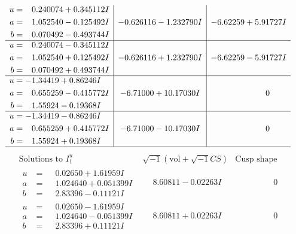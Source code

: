 \documentclass[1p]{elsarticle_modified}
\theoremstyle{definition}
\newcommand{\I}{\sqrt{-1}}
\begin{document}
$$\begin{array}{c|c|c}
\begin{aligned}
u &= \phantom{-}0.240074 + 0.345112 I \\
a &= \phantom{-}1.052540 - 0.125492 I \\
b &= \phantom{-}0.070492 - 0.493744 I\end{aligned}
 & -0.626116 - 1.232790 I & -6.62259 + 5.91727 I \\ \hline\begin{aligned}
u &= \phantom{-}0.240074 - 0.345112 I \\
a &= \phantom{-}1.052540 + 0.125492 I \\
b &= \phantom{-}0.070492 + 0.493744 I\end{aligned}
 & -0.626116 + 1.232790 I & -6.62259 - 5.91727 I \\ \hline\begin{aligned}
u &= -1.34419 + 0.86246 I \\
a &= \phantom{-}0.655259 - 0.415772 I \\
b &= \phantom{-}1.55924 - 0.19368 I\end{aligned}
 & -6.71000 + 10.17030 I & \phantom{-0.000000 } 0 \\ \hline\begin{aligned}
u &= -1.34419 - 0.86246 I \\
a &= \phantom{-}0.655259 + 0.415772 I \\
b &= \phantom{-}1.55924 + 0.19368 I\end{aligned}
 & -6.71000 - 10.17030 I & \phantom{-0.000000 } 0\\
 \hline 
 \end{array}$$\newpage$$\begin{array}{c|c|c}  
\text{Solutions to }I^u_{1}& \I (\text{vol} + \sqrt{-1}CS) & \text{Cusp shape}\\
 \hline 
\begin{aligned}
u &= \phantom{-}0.02650 + 1.61959 I \\
a &= \phantom{-}1.024640 + 0.051399 I \\
b &= \phantom{-}2.83396 - 0.11121 I\end{aligned}
 & \phantom{-}8.60811 - 0.02263 I & \phantom{-0.000000 } 0 \\ \hline\begin{aligned}
u &= \phantom{-}0.02650 - 1.61959 I \\
a &= \phantom{-}1.024640 - 0.051399 I \\
b &= \phantom{-}2.83396 + 0.11121 I\end{aligned}
 & \phantom{-}8.60811 + 0.02263 I & \phantom{-0.000000 } 0 \\ \hline\begin{aligned}

\end{aligned}
\end{array}$$
\end{document}
